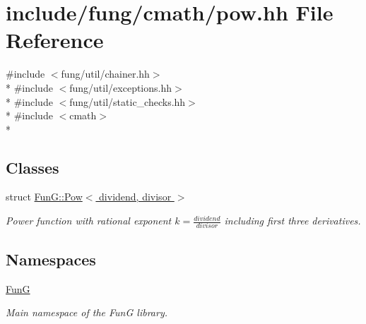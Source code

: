 \hypertarget{pow_8hh}{}\section{include/fung/cmath/pow.hh File Reference}
\label{pow_8hh}
{\ttfamily \#include $<$fung/util/chainer.\+hh$>$}\\*
{\ttfamily \#include $<$fung/util/exceptions.\+hh$>$}\\*
{\ttfamily \#include $<$fung/util/static\+\_\+checks.\+hh$>$}\\*
{\ttfamily \#include $<$cmath$>$}\\*
\subsection*{Classes}
\begin{DoxyCompactItemize}
\item 
struct \hyperlink{structFunG_1_1Pow}{Fun\+G\+::\+Pow$<$ dividend, divisor $>$}
\begin{DoxyCompactList}\small\item\em Power function with rational exponent $ k = \frac{dividend}{divisor} $ including first three derivatives. \end{DoxyCompactList}\end{DoxyCompactItemize}
\subsection*{Namespaces}
\begin{DoxyCompactItemize}
\item 
 \hyperlink{namespaceFunG}{FunG}
\begin{DoxyCompactList}\small\item\em Main namespace of the FunG library. \end{DoxyCompactList}\end{DoxyCompactItemize}
